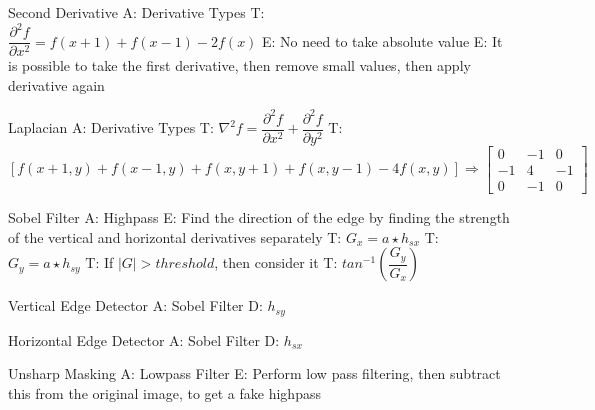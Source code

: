 \documentclass{article}
\begin{document}
Second Derivative
A: Derivative Types
T: $\dfrac{\partial^2 f}{\partial x^2} = f(x+1) + f(x-1) - 2f(x)$
E: No need to take absolute value
E: It is possible to take the first derivative, then remove small values, then apply derivative again

Laplacian
A: Derivative Types
T: $\nabla^2f = \dfrac{\partial^2f}{\partial x^2} + \dfrac{\partial^2f}{\partial y^2}$
T: $[f(x+1, y) + f(x-1, y) + f(x, y+1) + f(x, y-1) - 4f(x, y)] \Rightarrow \begin{bmatrix} 0 & -1 & 0 \\ -1 & 4 & -1 \\ 0 & -1 & 0 \end{bmatrix}$

Sobel Filter
A: Highpass
E: Find the direction of the edge by finding the strength of the vertical and horizontal derivatives separately
T: $G_x = a \star h_{sx}$
T: $G_y = a \star h_{sy}$
T: If $|G| > threshold$, then consider it
T: $tan^{-1}(\dfrac{G_y}{G_x})$

Vertical Edge Detector
A: Sobel Filter
D: $h_{sy}$

Horizontal Edge Detector
A: Sobel Filter
D: $h_{sx}$

Unsharp Masking
A: Lowpass Filter
E: Perform low pass filtering, then subtract this from the original image, to get a fake highpass
\end{document}
